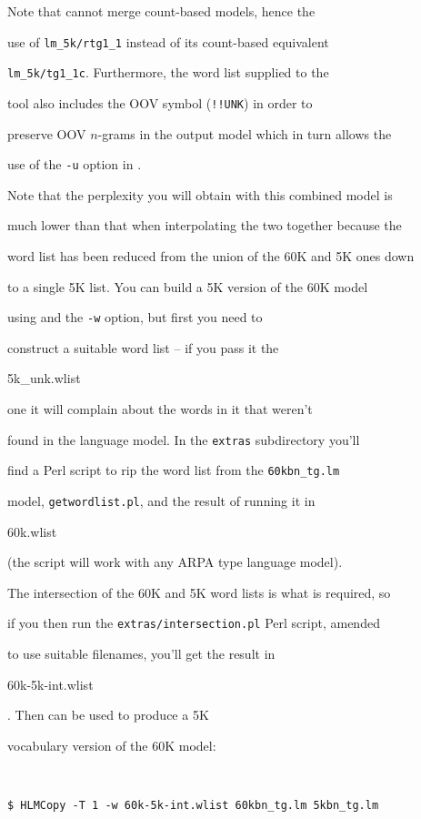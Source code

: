 Note that  cannot merge count-based models, hence the


use of \texttt{lm\_5k/rtg1\_1} instead of its count-based equivalent


\texttt{lm\_5k/tg1\_1c}.  Furthermore, the word list supplied to the


tool also includes the OOV symbol (\texttt{!!UNK}) in order to


preserve OOV $n$-grams in the output model which in turn allows the


use of the \texttt{-u} option in .





Note that the perplexity you will obtain with this combined model is


much lower than that when interpolating the two together because the


word list has been reduced from the union of the 60K and 5K ones down


to a single 5K list.  You can build a 5K version of the 60K model


using  and the {\tt -w} option, but first you need to


construct a suitable word list -- if you pass it the {\tt


5k\_unk.wlist} one it will complain about the words in it that weren't


found in the language model.  In the {\tt extras} subdirectory you'll


find a Perl script to rip the word list from the {\tt 60kbn\_tg.lm}


model, {\tt getwordlist.pl}, and the result of running it in {\tt


60k.wlist} (the script will work with any ARPA type language model).


The intersection of the 60K and 5K word lists is what is required, so


if you then run the {\tt extras/intersection.pl} Perl script, amended


to use suitable filenames, you'll get the result in {\tt


60k-5k-int.wlist}.  Then  can be used to produce a 5K


vocabulary version of the 60K model:


\begin{verbatim}


$ HLMCopy -T 1 -w 60k-5k-int.wlist 60kbn_tg.lm 5kbn_tg.lm


\end{verbatim} %



